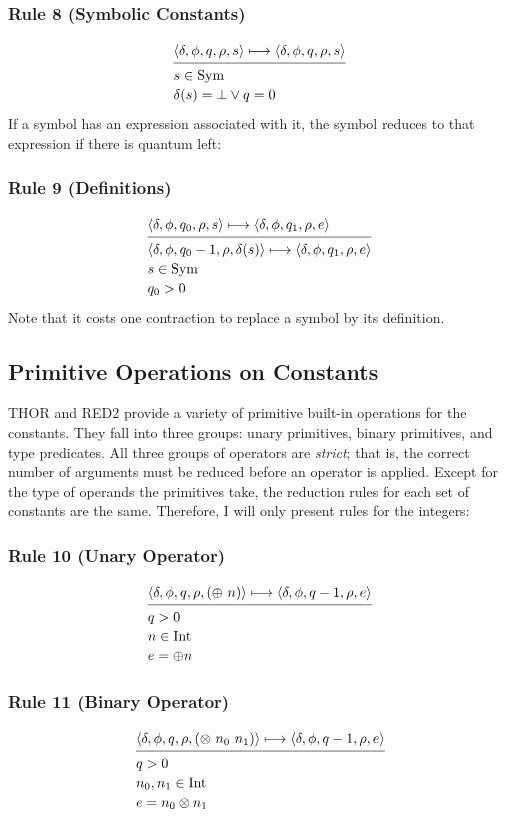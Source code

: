 \subsubsection*{Rule 8 (Symbolic Constants)}
\[
\semanticrule{
\cfg{\delta}{\phi}{q}{\rho}{s}\redsto
      \cfg{\delta}{\phi}{q}{\rho}{s}
}{
s\in\Sym\\ \delta(s)=\bot\vee q=0
}
\]
If a symbol has an expression associated with it, the symbol reduces to that
expression if there is quantum left:

\subsubsection*{Rule 9 (Definitions)}
\[
\semanticrule{
\cfg{\delta}{\phi}{q_0}{\rho}{s}\redsto
\cfg{\delta}{\phi}{q_1}{\rho}{e}
}{
\cfg{\delta}{\phi}{q_0-1}{\rho}{\delta(s)}\redsto
\cfg{\delta}{\phi}{q_1}{\rho}{e}\\
s\in\Sym\\ q_0>0
}
\]
Note that it costs one contraction to replace a symbol by its definition.

\subsection{Primitive Operations on Constants}

THOR and RED2 provide a variety of primitive built-in operations for the
constants. They fall into three groups: unary primitives, binary primitives, and
type predicates. All three groups of operators are \emph{strict}; that is, the correct
number of arguments must be reduced before an operator is applied. Except for
the type of operands the primitives take, the reduction rules for each set of
constants are the same. Therefore, I will only present rules for the integers:

\subsubsection*{Rule 10 (Unary Operator)}
\[
\semanticrule{
\cfg{\delta}{\phi}{q}{\rho}{(\oplus\ n)}\redsto
      \cfg{\delta}{\phi}{q-1}{\rho}{e}
}{
q>0\\ n\in\Int\\ e=\oplus n
}
\]

\subsubsection*{Rule 11 (Binary Operator)}
\[
\semanticrule{
\cfg{\delta}{\phi}{q}{\rho}{(\otimes\ n_0\ n_1)}\redsto
      \cfg{\delta}{\phi}{q-1}{\rho}{e}
}{
q>0\\ n_0,n_1\in\Int\\ e=n_0\otimes n_1
}
\]

